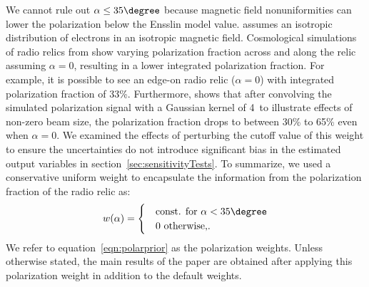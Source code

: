 \documentclass[letterpaper,useAMS,usenatbib]{mn2e}
\begin{document}
We cannot rule out $\alpha \leq 35\degree$ because magnetic field
nonuniformities can lower the polarization below the Ensslin model value.
\cite{E98} assumes an isotropic distribution of electrons in an isotropic magnetic field. Cosmological
simulations of radio relics from \cite{S13} show varying polarization
fraction across and along the relic assuming $\alpha = 0$, resulting in a
lower integrated polarization fraction. For example, it is possible to see 
an edge-on radio relic ($\alpha = 0$) with integrated polarization fraction of 33\%. 
Furthermore, \cite{S13} shows that after convolving the
simulated polarization signal with a Gaussian kernel of 4\arcmin~to
illustrate effects of non-zero beam size, the polarization fraction drops
to between 30\% to 65\% even when $\alpha = 0$. We examined the effects of perturbing
the cutoff value of this weight to ensure the uncertainties do not
introduce significant bias in the estimated output variables in
section~\ref{sec:sensitivityTests}.
To summarize, we used a conservative uniform weight to encapsulate the
information from the polarization fraction of the radio relic as:
\begin{equation}
w(\alpha) = 
	\begin{cases}
	& \text{const. for  }\alpha < 35 \degree \\ 
	& 0 \text{ otherwise,}\label{eqn:polarprior}.
	\end{cases}
\end{equation}
We refer to equation~\ref{eqn:polarprior} as the polarization weights. Unless
otherwise stated, the main results of the paper are obtained after applying
this polarization weight in addition to the default weights.
\end{document}
